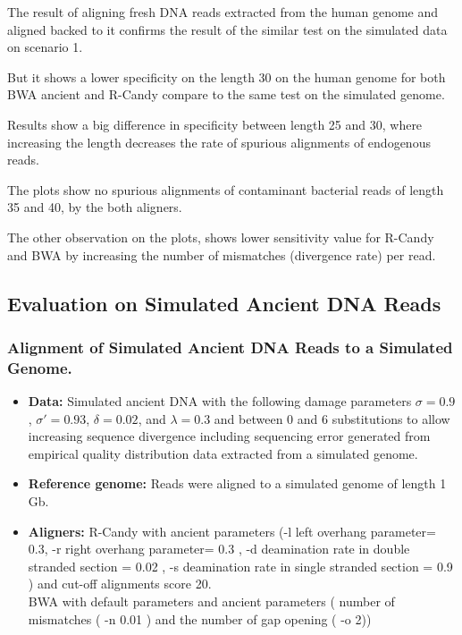 \documentclass[11pt,a4paper]{report}
\begin{document}
The result of aligning fresh DNA reads extracted from the human genome and 
aligned backed to it confirms the result of the similar test on the 
simulated data on scenario 1.

But it shows a lower specificity on the length 30 on the human genome for 
both BWA ancient and R-Candy compare to the same test on the simulated genome.

Results show a big difference in specificity between length 25 and 30, where 
increasing the length decreases the rate of spurious alignments of endogenous reads.

The plots show no spurious alignments of contaminant bacterial reads of 
length 35 and 40, by the both aligners.

The other observation on the plots, shows lower sensitivity value for R-Candy 
and BWA by increasing the number of  mismatches (divergence rate) per read.



\subsection{Evaluation on Simulated Ancient DNA Reads}

\subsubsection{Alignment of Simulated Ancient DNA Reads to a Simulated Genome.}
\label{ Alignment of Simulated Ancient DNA Reads to a Simulated Genome.}

\begin{itemize}
 
   
    \item \textbf{Data:} Simulated ancient DNA 
     with the following damage parameters $ \sigma = 0.9$, 
    $ \sigma\prime = 0.93 $, $\delta = 0.02 $,  and $\lambda = 0.3 $ and 
    between 0 and 6 substitutions to allow increasing sequence divergence
    including sequencing error generated from empirical quality distribution data
    extracted from a simulated genome.
  
 

  \item \textbf{Reference genome:}  Reads were aligned to a simulated genome of 
length 1 Gb.


  \item \textbf{Aligners:} R-Candy with ancient parameters 
  (-l left overhang parameter= 0.3, -r right overhang parameter= 0.3 , 
-d deamination rate in double stranded section = 0.02 , 
-s deamination rate in single stranded section = 0.9 )
  and cut-off alignments score 20. \\
  BWA with default parameters and ancient parameters \cite{green2010draft}
   ( number of mismatches ( -n 0.01 ) and the number of gap opening ( -o 2))

  \end{itemize}
\end{document}
